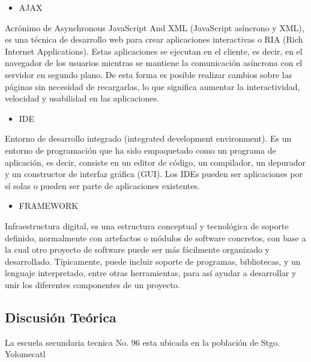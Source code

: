 \begin{itemize}
\item AJAX
\end{itemize}
{\large Acrónimo de Asynchronous JavaScript And XML (JavaScript asíncrono y XML), es una técnica de desarrollo web para crear aplicaciones interactivas o RIA (Rich Internet Applications). Estas aplicaciones se ejecutan en el cliente, es decir, en el navegador de los usuarios mientras se mantiene la comunicación asíncrona con el servidor en segundo plano. De esta forma es posible realizar cambios sobre las páginas sin necesidad de recargarlas, lo que significa aumentar la interactividad, velocidad y usabilidad en las aplicaciones.}\\

\begin{itemize}
\item IDE
\end{itemize}
{\large Entorno de desarrollo integrado (integrated development environment). Es un entorno de programación que ha sido empaquetado como un programa de aplicación, es decir, consiste en un editor de código, un compilador, un depurador y un constructor de interfaz gráfica (GUI). Los IDEs pueden ser aplicaciones por sí solas o pueden ser parte de aplicaciones existentes.}\\

\begin{itemize}
\item FRAMEWORK
\end{itemize}
{\large Infraestructura digital, es una estructura conceptual y tecnológica de soporte definido, normalmente con artefactos o módulos de software concretos, con base a la cual otro proyecto de software puede ser más fácilmente organizado y desarrollado. Típicamente, puede incluir soporte de programas, bibliotecas, y un lenguaje interpretado, entre otras herramientas, para así ayudar a desarrollar y unir los diferentes componentes de un proyecto.}\\

\subsection{Discusión Teórica}

{\large La escuela secundaria tecnica No. 96 esta ubicada en la población de Stgo. Yolomecatl}\\